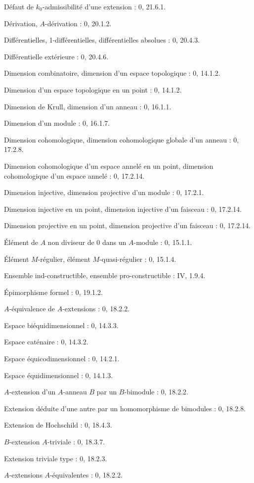 \documentclass[10pt,oneside]{book}
\newcommand{\oldpage}[2][]{%
  \setcounter{footnote}{0}%
  \marginpar{\scriptsize\textbf{#1}~|~#2}\ignorespaces}
\begin{document}
Défaut de $k_0$-admissibilité d'une extension : 0, 21.6.1.\par
Dérivation, $A$-dérivation : 0, 20.1.2.\par
Différentielles, 1-différentielles, différentielles absolues : 0, 20.4.3.\par
Différentielle extérieure : 0, 20.4.6.\par
Dimension combinatoire, dimension d'un espace topologique : 0, 14.1.2.\par
Dimension d'un espace topologique en un point : 0, 14.1.2.\par
Dimension de Krull, dimension d'un anneau : 0, 16.1.1.\par
Dimension d'un module : 0, 16.1.7.\par
Dimension cohomologique, dimension cohomologique globale d'un anneau : 0, 17.2.8.\par
Dimension cohomologique d'un espace annelé en un point, dimension cohomologique d'un espace annelé : 0, 17.2.14.\par

\clearpage
\oldpage[IV-1]{255}
Dimension injective, dimension projective d'un module : 0, 17.2.1.\par
Dimension injective en un point, dimension injective d'un faisceau : 0, 17.2.14.\par
Dimension projective en un point, dimension projective d'un faisceau : 0, 17.2.14.\par

Élément de $A$ non diviseur de 0 dans un $A$-module : 0, 15.1.1.\par
Élément $M$-régulier, élément $M$-quasi-régulier : 0, 15.1.4.\par
Ensemble ind-constructible, ensemble pro-constructible : IV, 1.9.4.\par
Épimorphisme formel : 0, 19.1.2.\par
$A$-équivalence de $A$-extensions : 0, 18.2.2.\par
Espace biéquidimensionnel : 0, 14.3.3.\par
Espace caténaire : 0, 14.3.2.\par
Espace équicodimensionnel : 0, 14.2.1.\par
Espace équidimensionnel : 0, 14.1.3.\par
$A$-extension d'un $A$-anneau $B$ par un $B$-bimodule : 0, 18.2.2.\par
Extension déduite d'une autre par un homomorphisme de bimodules : 0, 18.2.8.\par
Extension de Hochschild : 0, 18.4.3.\par
$B$-extension $A$-triviale : 0, 18.3.7.\par
Extension triviale type : 0, 18.2.3.\par
$A$-extensions $A$-équivalentes : 0, 18.2.2.\par
\end{document}
